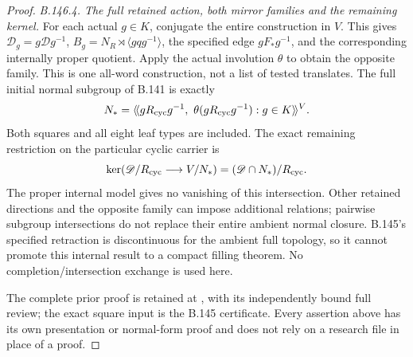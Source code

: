 \begin{proof}
\emph{B.146.4. The full retained action, both mirror families and the remaining kernel.}
For each actual $g\in K$, conjugate the entire construction in
$V$. This gives $\mathscr D_g=g\mathscr Dg^{-1}$,
$B_g=N_R\rtimes\langle gqg^{-1}\rangle$, the specified edge
$gF_*g^{-1}$, and the corresponding internally proper quotient.
Apply the actual involution $\theta$ to obtain the opposite
family. This is one all-word construction, not a list of tested
translates. The full initial normal subgroup of B.141 is exactly
\begin{equation}\label{eq:B146-full-normal}
 N_*=\langle\!\langle gR_{\rm cyc}g^{-1},\
          \theta(gR_{\rm cyc}g^{-1}):g\in K
                       \rangle\!\rangle^V.
\end{equation}
Both squares and all eight leaf types are included. The exact
remaining restriction on the particular cyclic carrier is
\begin{equation}\label{eq:B146-ambient-kernel}
 \ker(\mathscr D/R_{\rm cyc}\longrightarrow V/N_*)
          =(\mathscr D\cap N_*)/R_{\rm cyc}.
\end{equation}
The proper internal model gives no vanishing of this intersection.
Other retained directions and the opposite family can impose
additional relations; pairwise subgroup intersections do not
replace their entire ambient normal closure. B.145's specified
retraction is discontinuous for the ambient full topology, so it
cannot promote this internal result to a compact filling theorem.
No completion/intersection exchange is used here.

The complete prior proof is retained at
,
with its independently bound full review; the exact square input
is the B.145 certificate. Every assertion above has its own
presentation or normal-form proof and does not rely on a research
file in place of a proof.
\end{proof}
